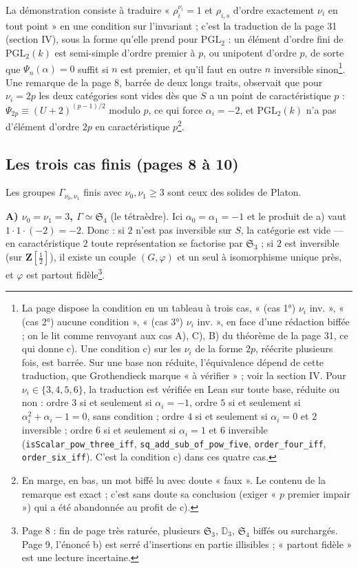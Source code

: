 \documentclass[11pt,a4paper]{article}
\begin{document}
La démonstration consiste à traduire « $\rho_i^{\nu_i} = 1$ et $\rho_{i,s}$
d'ordre exactement $\nu_i$ en tout point » en une condition sur l'invariant ;
c'est la traduction de la page 31 (section IV), sous la forme qu'elle prend
pour $\mathrm{PGL}_2$ : un élément d'ordre fini de $\mathrm{PGL}_2(k)$ est
semi-simple d'ordre premier à $p$, ou unipotent d'ordre $p$, de sorte que
$\Psi_n(\alpha) = 0$ suffit si $n$ est premier, et qu'il faut en outre $n$
inversible sinon\footnote{La page dispose la condition en un tableau à trois
cas, « (cas 1°) $\nu_i$ inv. », « (cas 2°) aucune condition », « (cas 3°)
$\nu_i$ inv. », en face d'une rédaction biffée ; on le lit comme renvoyant
aux cas A), C), B) du théorème de la page 31, ce qui donne c). Une
condition c) sur les $\nu_i$ de la forme $2p$, réécrite plusieurs fois, est
barrée. Sur une base non réduite, l'équivalence dépend de cette traduction,
que Grothendieck marque « à vérifier » ; voir la section IV. Pour
$\nu_i \in \{3, 4, 5, 6\}$, la traduction est vérifiée en Lean sur toute base,
réduite ou non : ordre $3$ si et seulement si $\alpha_i = -1$, ordre $5$ si et
seulement si $\alpha_i^2 + \alpha_i - 1 = 0$, sans condition ; ordre $4$ si et
seulement si $\alpha_i = 0$ et $2$ inversible ; ordre $6$ si et seulement si
$\alpha_i = 1$ et $6$ inversible (\texttt{isScalar\_pow\_three\_iff},
\texttt{sq\_add\_sub\_of\_pow\_five}, \texttt{order\_four\_iff},
\texttt{order\_six\_iff}). C'est la condition c) dans ces quatre cas.}. Une remarque
de la page 8, barrée de deux longs traits, observait que pour $\nu_i = 2p$ les
deux catégories sont vides dès que $S$ a un point de caractéristique $p$ :
$\Psi_{2p} \equiv (U + 2)^{(p-1)/2}$ modulo $p$, ce qui force $\alpha_i =
-2$, et $\mathrm{PGL}_2(k)$ n'a pas d'élément d'ordre $2p$ en caractéristique
$p$\footnote{En marge, en bas, un mot biffé lu avec doute « faux ». Le
contenu de la remarque est exact ; c'est sans doute sa conclusion (exiger
« $p$ premier impair ») qui a été abandonnée au profit de c).}.

\subsection*{Les trois cas finis (pages 8 à 10)}

Les groupes $\Gamma_{\nu_0,\nu_1}$ finis avec $\nu_0, \nu_1 \geq 3$ sont ceux
des solides de Platon.

\textbf{A) $\nu_0 = \nu_1 = 3$, $\Gamma \simeq \mathfrak{S}_4$}
(le tétraèdre). Ici $\alpha_0 = \alpha_1 = -1$ et le produit de a) vaut
$1 \cdot 1 \cdot (-2) = -2$. Donc : si $2$ n'est pas inversible sur $S$, la
catégorie est vide --- en caractéristique $2$ toute représentation se
factorise par $\mathfrak{S}_3$ ; si $2$ est inversible (sur
$\mathbf{Z}[\frac12]$), il existe un couple $(G, \varphi)$ et un seul à
isomorphisme unique près, et $\varphi$ est partout fidèle\footnote{Page 8 :
fin de page très raturée, plusieurs $\mathfrak{S}_3$, $\mathbb{D}_3$,
$\mathfrak{S}_4$ biffés ou surchargés. Page 9, l'énoncé b) est serré
d'insertions en partie illisibles ; « partout fidèle » est une lecture
incertaine.}.
\end{document}
